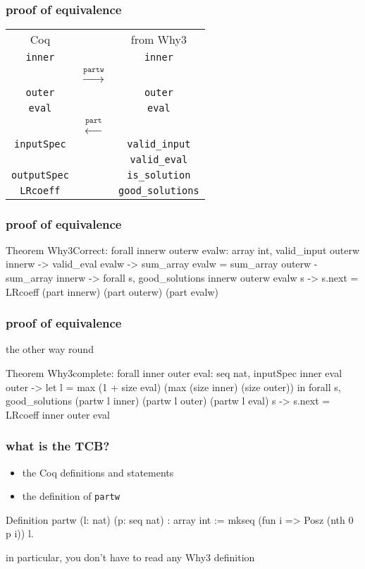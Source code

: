 \documentclass{beamer}
\let\emph\alert
\begin{document}
\begin{frame}\frametitle{proof of equivalence}
  \begin{center}
    \begin{tabular}{ccc}
      \emph{Coq} & & \emph{from Why3} \\[1em]
      \texttt{inner} & &       \texttt{inner} \\[-1em]
      & $\stackrel{\mathtt{partw}}{\longrightarrow}$
      & \\[-0.5em]
      \texttt{outer} & &\texttt{outer} \\
      \texttt{eval} & &       \texttt{eval} \\[-1.5em]
      & $\stackrel{\mathtt{part}}{\longleftarrow}$ & \\[1em]
      \texttt{inputSpec} & & \texttt{valid\_input} \\
                         & & \texttt{valid\_eval} \\
      \texttt{outputSpec} & & \texttt{is\_solution} \\
      \texttt{LRcoeff}   & & \texttt{good\_solutions}
    \end{tabular}
  \end{center}
\end{frame}

\begin{frame}[fragile]\frametitle{proof of equivalence}
\begin{coq}
Theorem Why3Correct:
  forall innerw outerw evalw: array int,
  valid_input outerw innerw ->
  valid_eval evalw ->
  sum_array evalw =
    sum_array outerw - sum_array innerw ->
  forall s, good_solutions innerw outerw evalw s ->
  s.next =
    LRcoeff (part innerw) (part outerw) (part evalw)
\end{coq}
\end{frame}

\begin{frame}[fragile]\frametitle{proof of equivalence}
the other way round
\bigskip
\begin{coq}
Theorem Why3complete:
  forall inner outer eval: seq nat,
  inputSpec inner eval outer ->
  let l = max (1 + size eval)
              (max (size inner) (size outer)) in
  forall s,
  good_solutions (partw l inner)
                 (partw l outer) (partw l eval) s ->
  s.next = LRcoeff inner outer eval
\end{coq}
\end{frame}

\begin{frame}[fragile]\frametitle{what is the TCB?}
  \begin{itemize}
  \item the Coq definitions and statements
  \item the definition of \texttt{partw}
  \end{itemize}
\begin{coq}
Definition partw (l: nat) (p: seq nat) : array int :=
  mkseq (fun i => Posz (nth 0 p i)) l.
\end{coq}

  \bigskip
  in particular, you don't have to read \emph{any} Why3 definition
\end{frame}
\end{document}
